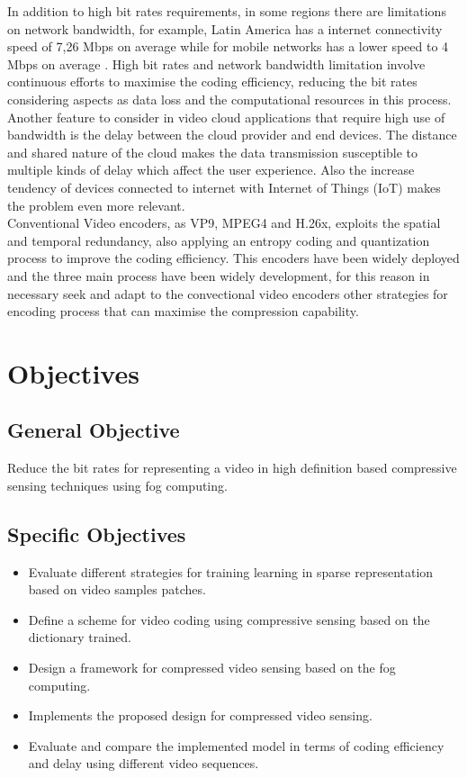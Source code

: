In addition to high bit rates requirements, in some regions there are limitations on  network bandwidth, for example, Latin America has a internet connectivity speed of 7,26 Mbps on average while for mobile networks has a lower speed to 4 Mbps on average \cite{cepal}. High bit rates and network bandwidth limitation involve continuous efforts to maximise the coding efficiency, reducing the bit rates considering aspects as data loss and the computational resources in this process. Another feature to consider in video cloud applications that require high use of bandwidth is the delay between the cloud provider and end devices. The distance and shared nature of the cloud makes the data transmission susceptible to multiple kinds of delay which affect the user experience. Also the increase tendency of devices connected to internet with Internet of Things (IoT) makes the problem even more relevant. \\


Conventional Video encoders, as VP9, MPEG4 and H.26x, exploits the spatial and temporal redundancy, also applying an entropy coding and quantization process to improve the coding efficiency. This encoders have been  widely deployed and the three main process have been widely development, for this reason in necessary seek and adapt to the convectional video encoders other strategies for encoding process that can maximise the compression capability. 


\section{Objectives}
\subsection{General Objective}
Reduce the bit rates for representing a video in high definition based compressive sensing techniques using  fog computing.
\subsection{Specific Objectives}
\begin{itemize}
\item Evaluate different strategies for training learning in sparse representation based on video samples patches.
\item Define a scheme for video coding using compressive sensing based on the dictionary trained.
\item Design a framework for compressed video sensing based on the fog computing. 
\item Implements the proposed design for compressed video sensing.
\item Evaluate and compare the implemented model in terms of coding efficiency and delay using different video sequences.
\end{itemize}

